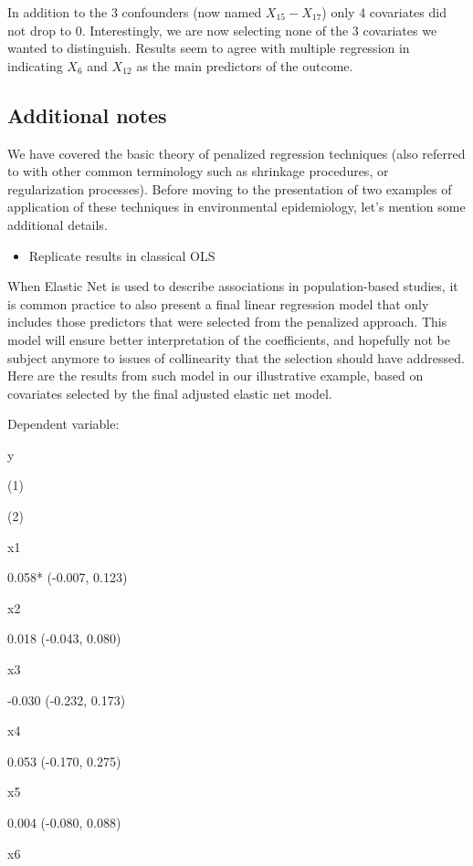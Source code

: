 \documentclass[
]{book}
\providecommand{\tightlist}{%
  \setlength{\itemsep}{0pt}\setlength{\parskip}{0pt}}
\begin{document}
In addition to the 3 confounders (now named \(X_{15}-X_{17}\)) only 4 covariates did not drop to 0. Interestingly, we are now selecting none of the 3 covariates we wanted to distinguish. Results seem to agree with multiple regression in indicating \(X_6\) and \(X_{12}\) as the main predictors of the outcome.

\hypertarget{additional-notes}{%
\subsection{Additional notes}\label{additional-notes}}

We have covered the basic theory of penalized regression techniques (also referred to with other common terminology such as shrinkage procedures, or regularization processes). Before moving to the presentation of two examples of application of these techniques in environmental epidemiology, let's mention some additional details.

\begin{itemize}
\tightlist
\item
  Replicate results in classical OLS
\end{itemize}

When Elastic Net is used to describe associations in population-based studies, it is common practice to also present a final linear regression model that only includes those predictors that were selected from the penalized approach. This model will ensure better interpretation of the coefficients, and hopefully not be subject anymore to issues of collinearity that the selection should have addressed. Here are the results from such model in our illustrative example, based on covariates selected by the final adjusted elastic net model.

Dependent variable:

y

(1)

(2)

x1

0.058* (-0.007, 0.123)

x2

0.018 (-0.043, 0.080)

x3

-0.030 (-0.232, 0.173)

x4

0.053 (-0.170, 0.275)

x5

0.004 (-0.080, 0.088)

x6
\end{document}
